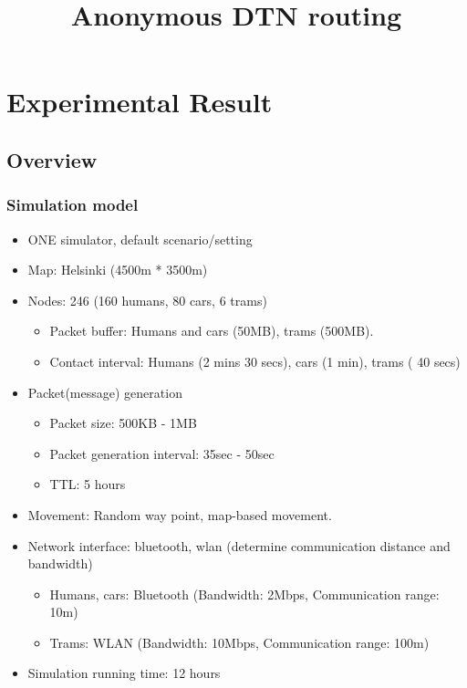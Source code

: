 \documentclass[11pt]{article}
\begin{document}
\title{Anonymous DTN routing}
\maketitle

\section{Experimental Result}
\subsection{Overview}

\subsubsection{Simulation model}
\begin{itemize}
 \item ONE simulator, default scenario/setting

 \item Map: Helsinki (4500m * 3500m)

 \item Nodes: 246 (160 humans, 80 cars, 6 trams)
  \begin{itemize}
   \item Packet buffer: Humans and cars (50MB), trams (500MB).
   \item Contact interval: Humans (2 mins 30 secs), cars (1 min), trams ( 40 secs)
  \end{itemize}

 \item Packet(message) generation
  \begin{itemize}
   \item Packet size: 500KB - 1MB
   \item Packet generation interval: 35sec - 50sec
   \item TTL: 5 hours
  \end{itemize}

 \item Movement: Random way point, map-based movement.

 \item Network interface: bluetooth, wlan (determine communication distance and bandwidth)
  \begin{itemize}
   \item Humans, cars: Bluetooth (Bandwidth: 2Mbps, Communication range: 10m)
   \item Trams: WLAN (Bandwidth: 10Mbps, Communication range: 100m)
  \end{itemize}

 \item Simulation running time: 12 hours
\end{itemize}
\end{document}
